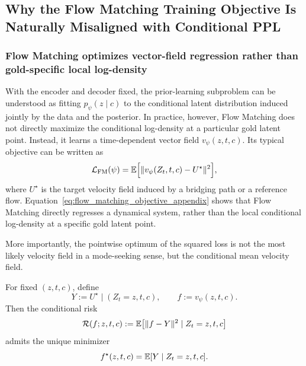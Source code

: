 \subsection{Why the Flow Matching Training Objective Is Naturally Misaligned with Conditional PPL}

\subsubsection{Flow Matching optimizes vector-field regression rather than gold-specific local log-density}

With the encoder and decoder fixed, the prior-learning subproblem can be understood as fitting $p_{\psi}(z\mid c)$ to the conditional latent distribution induced jointly by the data and the posterior. In practice, however, Flow Matching does not directly maximize the conditional log-density at a particular gold latent point. Instead, it learns a time-dependent vector field $v_{\psi}(z,t,c)$. Its typical objective can be written as
\begin{equation}
\mathcal L_{\mathrm{FM}}(\psi)
=
\mathbb{E}\Big[
\|v_{\psi}(Z_t,t,c)-U^{\star}\|^2
\Big],
\label{eq:flow_matching_objective_appendix}
\end{equation}
where $U^{\star}$ is the target velocity field induced by a bridging path or a reference flow. Equation~\eqref{eq:flow_matching_objective_appendix} shows that Flow Matching directly regresses a dynamical system, rather than the local conditional log-density at a specific gold latent point.

More importantly, the pointwise optimum of the squared loss is not the most likely velocity field in a mode-seeking sense, but the conditional mean velocity field.

\begin{proposition}
\label{prop:fm_conditional_mean_appendix}
For fixed $(z,t,c)$, define
\[
Y:=U^{\star}\mid (Z_t=z,t,c),
\qquad
f:=v_{\psi}(z,t,c).
\]
Then the conditional risk
\begin{equation}
\mathcal R(f;z,t,c)
:=
\mathbb{E}\bigl[\|f-Y\|^2\mid Z_t=z,t,c\bigr]
\label{eq:fm_conditional_risk_appendix}
\end{equation}
admits the unique minimizer
\begin{equation}
f^{\star}(z,t,c)=\mathbb{E}[Y\mid Z_t=z,t,c].
\label{eq:fm_conditional_mean_appendix}
\end{equation}
\end{proposition}


